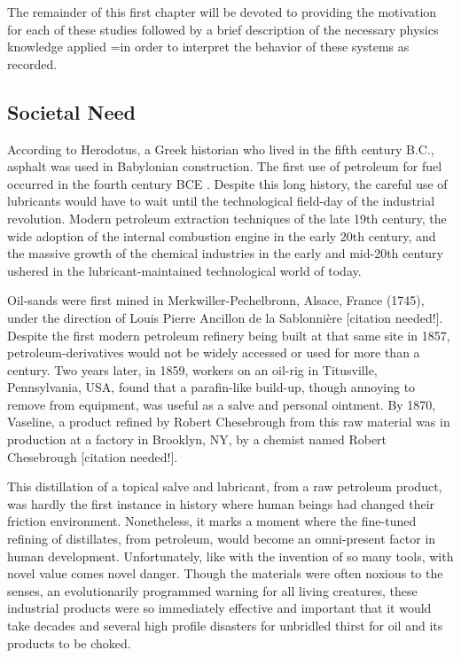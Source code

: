 The remainder of this first chapter will be devoted to providing the motivation for each of these studies followed by a brief description of the necessary physics knowledge applied =in order to interpret the behavior of these systems as recorded.

\subsection{Societal Need}

According to Herodotus, a Greek historian who lived in the fifth century B.C., asphalt was used in Babylonian construction. The first use of petroleum for fuel occurred in the fourth century BCE \cite{107}. Despite this long history, the careful use of lubricants would have to wait until the technological field-day of the industrial revolution. Modern petroleum extraction techniques of the late 19th century, the wide adoption of the internal combustion engine in the early 20th century, and the massive growth of the chemical industries in the early and mid-20th century ushered in the lubricant-maintained technological world of today. 

Oil-sands were first mined in Merkwiller-Pechelbronn, Alsace, France (1745), under the direction of Louis Pierre Ancillon de la Sablonnière [citation needed!]. Despite the first modern petroleum refinery being built at that same site in 1857, petroleum-derivatives would not be widely accessed or used for more than a century. Two years later, in 1859, workers on an oil-rig in Titusville, Pennsylvania, USA, found that a parafin-like build-up, though annoying to remove from equipment, was useful as a salve and personal ointment. By 1870, Vaseline, a product refined by Robert Chesebrough from this raw material was in production at a factory in Brooklyn, NY, by a chemist named Robert Chesebrough [citation needed!].


This distillation of a topical salve and lubricant, from a raw petroleum product, was hardly the first instance in history where human beings had changed their friction environment. Nonetheless, it marks a moment where the fine-tuned refining of distillates, from petroleum, would become an omni-present factor in human development. Unfortunately, like with the invention of so many tools, with novel value comes novel danger. Though the materials were often noxious to the senses, an evolutionarily programmed warning for all living creatures, these industrial products were so immediately effective and important that it would take decades and several high profile disasters for unbridled thirst for oil and its products to be choked.

